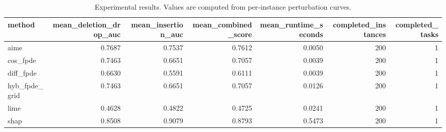 \begin{table}[t]
\caption{Experimental results. Values are computed from per-instance perturbation curves.}
\label{tab:main_results_computed}
\centering
\begin{tabular}{lrrrrrr}
\toprule
method & mean\_deletion\_drop\_auc & mean\_insertion\_auc & mean\_combined\_score & mean\_runtime\_seconds & completed\_instances & completed\_tasks \\
\midrule
aime & 0.7687 & 0.7537 & 0.7612 & 0.0050 & 200 & 1 \\
cos\_fpde & 0.7463 & 0.6651 & 0.7057 & 0.0039 & 200 & 1 \\
diff\_fpde & 0.6630 & 0.5591 & 0.6111 & 0.0039 & 200 & 1 \\
hyb\_fpde\_grid & 0.7463 & 0.6651 & 0.7057 & 0.0126 & 200 & 1 \\
lime & 0.4628 & 0.4822 & 0.4725 & 0.0241 & 200 & 1 \\
shap & 0.8508 & 0.9079 & 0.8793 & 0.5473 & 200 & 1 \\
\bottomrule
\end{tabular}

\end{table}

